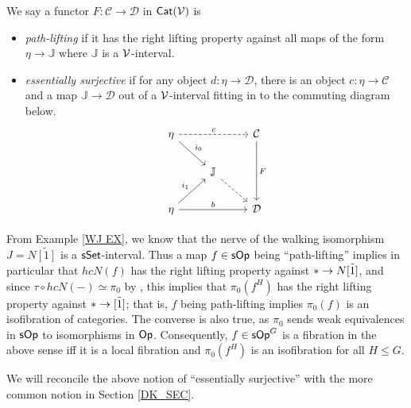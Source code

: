 \documentclass[a4paper,10pt
,draft
]{article}%
\newcommand{\J}{\mathbb J}
\renewcommand{\1}{\eta}%
\begin{document}
\begin{definition}
      \label{PL_ES_DEFN}
      We say a functor $F: \mathcal C \to \mathcal D$ in $\mathsf{Cat}(\mathcal V)$ is
      \begin{itemize} %
      \item \textit{path-lifting}
            if it has the right lifting property against all maps of the form
            $\1 \to \J$
            where $\J$ is a $\mathcal V$-interval.
      \item \textit{essentially surjective}
            if for any object $d: \1 \to \mathcal D$,
            there is an object $c: \1 \to \mathcal C$
            and a map $\J \to \mathcal D$ out of a $\mathcal V$-interval fitting in to the commuting diagram below.
            \begin{equation}
                  \begin{tikzcd}
                        \1 \arrow[rr, dashed, "c"] \arrow[dr, "i_0"]
                        &&
                        \mathcal C \arrow[dd, "F"]
                        \\
                        &
                        \J \arrow[dr, dashed]
                        \\
                        \1 \arrow[ur, " i_1"] \arrow[rr,"b"]
                        &&
                        \mathcal D
                  \end{tikzcd}
            \end{equation}
      \end{itemize}
\end{definition}


\begin{remark}
      \label{FIB_ISOFIB_REM}
      From Example \ref{WJ EX}, we know that the nerve of the walking isomorphism $J = N \tilde{[1]}$ is a $\mathsf{sSet}$-interval.
      Thus a map $f \in \mathsf{sOp}$ being ``path-lifting'' implies in particular that $h c N(f)$ has the right lifting property against $\** \to N \tilde{[1]}$,
      and since $\tau \circ h c N(-) \simeq \pi_0$ by \cite[Prop. 4.8]{CM11},
      this implies that $\pi_0(f^H)$ has the right lifting property against $\** \to \tilde{[1]}$;
      that is, $f$ being path-lifting implies $\pi_0(f)$ is an isofibration of categories.
      The converse is also true, as $\pi_0$ sends weak equivalences in $\mathsf{sOp}$ to isomorphisms in $\mathsf{Op}$.
      Consequently, $f \in \mathsf{sOp}^G$ is a fibration in the above sense iff it is a local fibration and $\pi_0(f^H)$ is an isofibration for all $H \leq G$.

      We will reconcile the above notion of ``essentially surjective'' with the more common notion in Section \ref{DK_SEC}. 
\end{remark}
\end{document}
